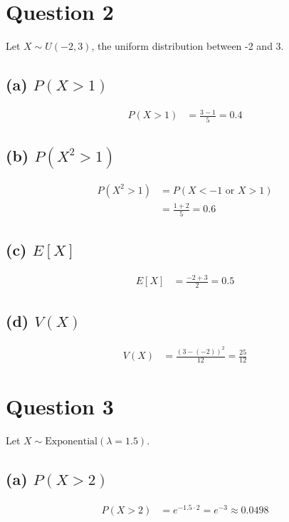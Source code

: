 \documentclass[12pt]{article}
\begin{document}
\section*{Question 2}
Let $X \sim U(-2, 3)$, the uniform distribution between -2 and 3.

\subsection*{(a) $P(X > 1)$}
\begin{align*}
    P(X > 1) &= \frac{3 - 1}{5} = 0.4
\end{align*}
\subsection*{(b) $P(X^2 > 1)$}
\begin{align*}
    P(X^2 > 1) &= P(X < -1 \text{ or } X > 1) \\
    &= \frac{1 + 2}{5} = 0.6
\end{align*}

\subsection*{(c) $E[X]$}
\begin{align*}
    E[X] &= \frac{-2 + 3}{2} = 0.5
\end{align*}

\subsection*{(d) $V(X)$}
\begin{align*}
    V(X) &= \frac{(3 - (-2))^2}{12} = \frac{25}{12}
\end{align*}

\section*{Question 3}
Let $X \sim \text{Exponential}(\lambda = 1.5)$.

\subsection*{(a) $P(X > 2)$}
\begin{align*}
    P(X > 2) &= e^{-1.5 \cdot 2} = e^{-3} \approx 0.0498
\end{align*}
\end{document}
